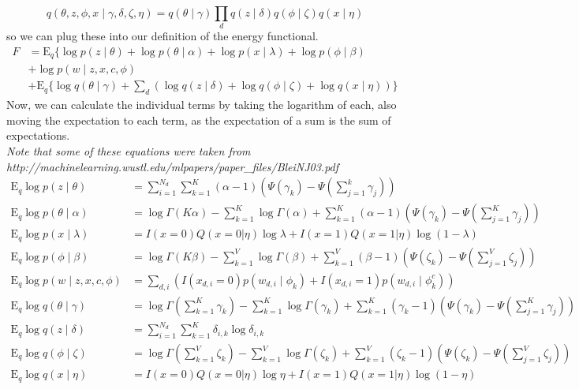\documentclass[12pt]{article}
\begin{document}
\begin{equation*}
q(\theta, z, \phi, x \mid \gamma, \delta, \zeta, \eta) = q(\theta \mid \gamma) \prod_d q(z \mid \delta) q(\phi \mid \zeta) q(x \mid \eta)
\end{equation*}
so we can plug these into our definition of the energy functional.
\begin{align*}
F &= \mathrm{E}_q \{\log p(z \mid \theta) + \log p(\theta \mid \alpha) + \log p(x \mid \lambda) + \log p(\phi \mid \beta) \\
&+ \log p(w \mid z, x, c, \phi) \\
&+ \mathrm{E}_q \{ \log q(\theta \mid \gamma) + \sum_d \left( \log q(z \mid \delta) + \log q(\phi \mid \zeta) + \log q(x \mid \eta) \right) \} 
\end{align*}
Now, we can calculate the individual terms by taking the logarithm of each, also moving the expectation to each term, as the expectation of a sum is the sum of expectations.\\
\noindent \textit{Note that some of these equations were taken from\\ http://machinelearning.wustl.edu/mlpapers/paper\_files/BleiNJ03.pdf }
\begin{align*}
\mathrm{E}_q \log p(z \mid \theta) &= \sum\limits_{i=1}^{N_d} \sum\limits_{k=1}^K (\alpha - 1)(\Psi(\gamma_k) - \Psi(\sum_{j=1}^k \gamma_j) ) \\
\mathrm{E}_q\log p(\theta \mid \alpha) &= \log \Gamma (K \alpha) - \sum\limits_{k=1}^K \log \Gamma(\alpha) + \sum\limits_{k=1}^K (\alpha - 1)(\Psi(\gamma_k) - \Psi(\sum_{j=1}^K \gamma_j) )\\
\mathrm{E}_q\log p(x \mid \lambda) &= I(x=0) Q(x=0|\eta) \log \lambda + I(x=1) Q(x=1|\eta) \log (1-\lambda) \\
\mathrm{E}_q\log p(\phi \mid \beta) &= \log \Gamma (K \beta) - \sum\limits_{k=1}^V \log \Gamma(\beta) + \sum\limits_{k=1}^V (\beta - 1)(\Psi(\zeta_k) - \Psi(\sum_{j=1}^V \zeta_j) )\\
\mathrm{E}_q\log p(w \mid z, x, c, \phi) &= \sum_{d,i} \left( I(x_{d,i} = 0) p(w_{d,i} \mid \phi_k) + I(x_{d,i} = 1) p(w_{d,i} \mid \phi_{k}^{c})  \right)\\
\mathrm{E}_q\log q(\theta \mid \gamma) &= \log \Gamma (\sum\limits_{k=1}^K \gamma_k) - \sum\limits_{k=1}^K \log \Gamma(\gamma_k) + \sum\limits_{k=1}^K (\gamma_k - 1)(\Psi(\gamma_k) - \Psi(\sum_{j=1}^K \gamma_j) )\\
\mathrm{E}_q\log q(z \mid \delta) &= \sum\limits_{i=1}^{N_d} \sum\limits_{k=1}^K \delta_{i,k} \log \delta_{i,k} \\
\mathrm{E}_q\log q(\phi \mid \zeta) &= \log \Gamma (\sum\limits_{k=1}^V \zeta_k) - \sum\limits_{k=1}^V \log \Gamma(\zeta_k) + \sum\limits_{k=1}^V (\zeta_k - 1)(\Psi(\zeta_k) - \Psi(\sum_{j=1}^V \zeta_j) )\\
\mathrm{E}_q\log q(x \mid \eta) &= I(x=0) Q(x=0|\eta) \log \eta + I(x=1) Q(x=1|\eta) \log (1-\eta) \\
\end{align*}
\end{document}
